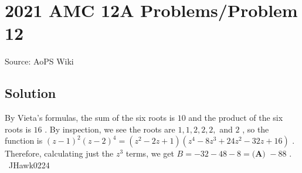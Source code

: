 \documentclass[12pt]{article}
\begin{document}
\section*{{2021 AMC 12A Problems/Problem 12}}
Source: AoPS Wiki

\subsection*{Solution}
By Vieta's formulas, the sum of the six roots is $10$ and the product of the six roots is $16$ . By inspection, we see the roots are $1, 1, 2, 2, 2,$ and $2$ , so the function is $(z-1)^2(z-2)^4=(z^2-2z+1)(z^4-8z^3+24z^2-32z+16)$ . Therefore, calculating just the $z^3$ terms, we get $B = -32 - 48 - 8 = \boxed{\textbf{(A) }{-}88}$ . ~JHawk0224
\end{document}
